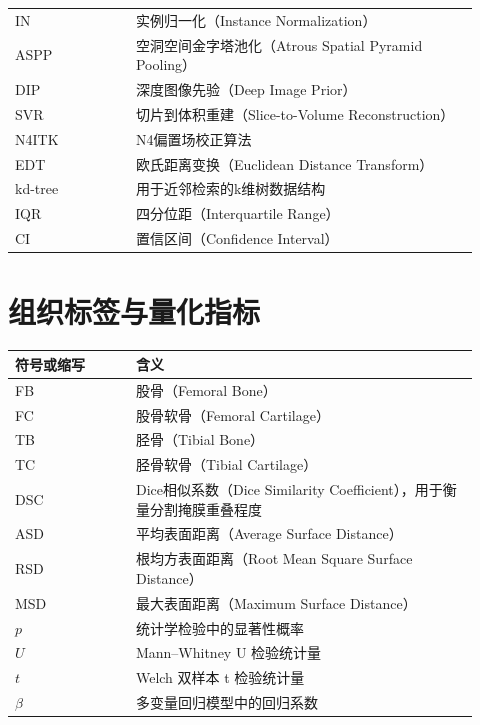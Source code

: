 \begin{longtable}{p{0.24\linewidth}p{0.68\linewidth}}
  IN & 实例归一化（Instance Normalization） \\
  ASPP & 空洞空间金字塔池化（Atrous Spatial Pyramid Pooling） \\
  DIP & 深度图像先验（Deep Image Prior） \\
  SVR & 切片到体积重建（Slice-to-Volume Reconstruction） \\
  N4ITK & N4偏置场校正算法 \\
  EDT & 欧氏距离变换（Euclidean Distance Transform） \\
  kd-tree & 用于近邻检索的k维树数据结构 \\
  IQR & 四分位距（Interquartile Range） \\
  CI & 置信区间（Confidence Interval） \\
  \bottomrule
\end{longtable}

\section{组织标签与量化指标}
\begin{longtable}{p{0.24\linewidth}p{0.68\linewidth}}
  \toprule
  符号或缩写 & 含义 \\
  \midrule
  FB & 股骨（Femoral Bone） \\
  FC & 股骨软骨（Femoral Cartilage） \\
  TB & 胫骨（Tibial Bone） \\
  TC & 胫骨软骨（Tibial Cartilage） \\
  DSC & Dice相似系数（Dice Similarity Coefficient），用于衡量分割掩膜重叠程度 \\
  ASD & 平均表面距离（Average Surface Distance） \\
  RSD & 根均方表面距离（Root Mean Square Surface Distance） \\
  MSD & 最大表面距离（Maximum Surface Distance） \\
  $p$ & 统计学检验中的显著性概率 \\
  $U$ & Mann--Whitney U 检验统计量 \\
  $t$ & Welch 双样本 t 检验统计量 \\
  $\beta$ & 多变量回归模型中的回归系数 \\
  \bottomrule
\end{longtable}

